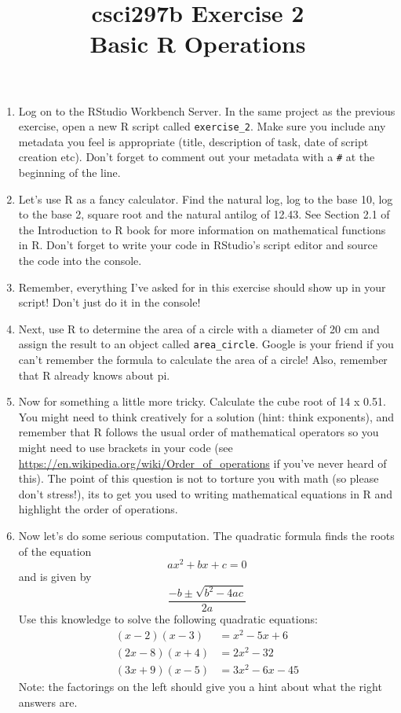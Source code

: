 \documentclass[12pt]{article}
\title{csci297b Exercise 2\\ Basic R Operations}
\date{}
\begin{document}
\maketitle

\begin{enumerate}

\centerline{\bf Part 1}

\item Log on to the RStudio Workbench Server. 
In the same project as the previous exercise, open a new R script called 
\verb|exercise_2|.
Make sure you include any metadata you feel is appropriate (title, description of task, date of script creation etc). Don’t forget to comment out your metadata with a \lstinline{#} at the beginning of the line.

 

\item Let’s use R as a fancy calculator. Find the natural log, log to the base 10, log to the base 2, square root and the natural antilog of 12.43. See Section 2.1 of the Introduction to R book for more information on mathematical functions in R. Don’t forget to write your code in RStudio’s script editor and source the code into the console.


\item Remember, everything I've asked for in this exercise should show up
in your script!  Don't just do it in the console!
 

\item Next, use R to determine the area of a circle with a diameter of 20 cm and assign the result to an object called \lstinline{area_circle}.
 Google is your friend if you can’t remember the formula to calculate the area of a circle! Also, remember that R already knows about pi.
 

\item Now for something a little more tricky. Calculate the cube root of 14 x 0.51. You might need to think creatively for a solution (hint: think exponents), and remember that R follows the usual order of mathematical operators so you might need to use brackets in your code (see 
\url{https://en.wikipedia.org/wiki/Order_of_operations} if you’ve never heard of this). The point of this question is not to torture you with math (so please don’t stress!), its to get you used to writing mathematical equations in R and highlight the order of operations.

 
 \item Now let's do some serious computation.  The quadratic formula finds the roots of the
 equation
 \[ ax^2 + bx + c = 0\]
 and is given by
 \[
 \frac{-b \pm \sqrt{b^2 - 4ac}}{2a}
 \]
 Use this knowledge to solve the following quadratic equations:
 \begin{align*}
 (x - 2)(x - 3) &= x^2 - 5 x + 6\\
 (2x - 8)(x + 4) &= 2x^2 - 32\\
 (3x + 9)(x - 5) &= 3x^2 -6x -45
 \end{align*}
 Note: the factorings on the left should give you a hint about
 what the right answers are.
 

\end{enumerate}
\end{document}
